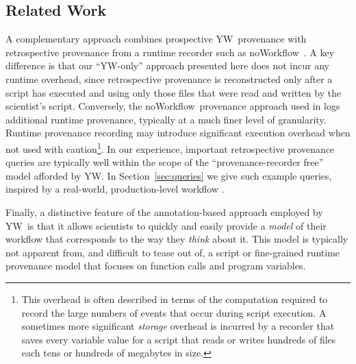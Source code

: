 \documentclass[nocopyrightspace]{sigplanconf}
\newcommand{\NW}{\textsf{noWorkflow}}
\newcommand{\yw}{\textsf{YW}}
\begin{document}
\subsection*{Related Work}
A complementary approach \cite{dey15} combines prospective \yw\
provenance with retrospective provenance from a runtime recorder such
as \NW\ \cite{murta2014nw}. A key difference is that our ``\yw-only''
approach presented here does not incur any runtime overhead, since
retrospective provenance is reconstructed only after a script has
executed and using only those files that were read and written by the
scientist's script. Conversely, the \NW\ provenance approach
used in \cite{dey15} logs additional runtime provenance, typically at
a much finer level of granularity. Runtime provenance recording may
introduce significant execution overhead when not used with
caution\footnote{This overhead is often described in terms of the 
computation required to record the large numbers of events that occur
during script execution.  A sometimes more significant
\emph{storage} overhead is incurred by a recorder that saves every variable
value for a script that reads or writes hundreds of files each tens or hundreds of megabytes
in size.}. In our experience, important retrospective provenance queries
are typically well within the scope of the ``provenance-recorder
free'' model afforded by \yw.  In Section~\ref{sec:queries} we give
such example queries, inspired by a real-world, production-level
workflow \cite{tsai2013autodrug}.

Finally, a distinctive feature of the annotation-based approach
employed by \yw\ is that it allows scientists to quickly and easily
provide a \emph{model} of their workflow that corresponds to the way
they \emph{think} about it. This model is
typically not apparent from, and difficult to tease out of, a script
or fine-grained runtime provenance model that focuses on function
calls and program variables.


\end{document}
